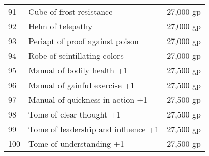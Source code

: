 \begin{table}[]
\begin{tabular}{lll}
91  & Cube of frost resistance                    & 27,000 gp    \\
92  & Helm of telepathy                           & 27,000 gp    \\
93  & Periapt of proof against poison             & 27,000 gp    \\
94  & Robe of scintillating colors                & 27,000 gp    \\
95  & Manual of bodily health +1                  & 27,500 gp    \\
96  & Manual of gainful exercise +1               & 27,500 gp    \\
97  & Manual of quickness in action +1            & 27,500 gp    \\
98  & Tome of clear thought +1                    & 27,500 gp    \\
99  & Tome of leadership and influence +1         & 27,500 gp    \\
100 & Tome of understanding +1                    & 27,500 gp   
\end{tabular}
\end{table}

